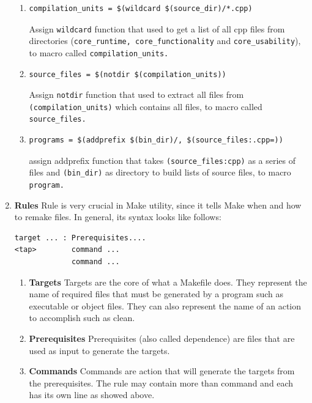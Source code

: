 \documentclass[11pt]{report}
\begin{document}
\begin{enumerate}
\begin{enumerate}
\item \begin{verbatim}
compilation_units = $(wildcard $(source_dir)/*.cpp)
\end{verbatim}
Assign \texttt{wildcard} function that used to get a list of all cpp files from directories (\texttt{core\_runtime, core\_functionality} and \texttt{core\_usability}), to macro called \texttt{compilation\_units.}

\item \begin{verbatim}
source_files = $(notdir $(compilation_units))
\end{verbatim}
Assign \texttt{notdir} function that used to extract all files from \texttt{(compilation\_units)} which contains all files, to macro called \texttt{source\_files.}

\item \begin{verbatim}
programs = $(addprefix $(bin_dir)/, $(source_files:.cpp=))
\end{verbatim}
assign addprefix function that takes \texttt{(source\_files:cpp)} as a series of files and \texttt{(bin\_dir)} as directory to build lists of source files, to macro \texttt{program.} 
\end{enumerate}

\item \textbf{Rules} Rule is very crucial in Make utility, since it tells Make when and how to remake files. In general, its syntax looks like follows:
\begin{verbatim}
target ... : Prerequisites....
<tap>        command ...
             command ...
\end{verbatim}

\begin{enumerate}
\item \textbf{Targets} Targets are the core of what a Makefile does. They represent the name of required files that must be generated by a program such as executable or object files. They can also represent the name of an action to accomplish such as clean.

\item \textbf{Prerequisites} Prerequisites (also called dependence) are files that are used as input to generate the targets.

\item \textbf{Commands} Commands are action that will generate the targets from the prerequisites. The rule may contain more than command and each has its own line as showed above.
\end{enumerate}


\end{enumerate}
\end{document}
